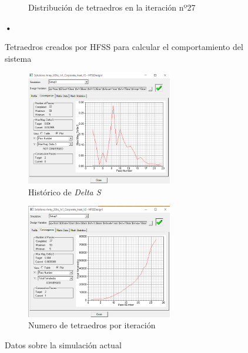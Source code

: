 \begin{figure}[H]
\begin{subfigure}[b]{0.4\textwidth}
         \caption{Distribución de tetraedros en la iteración nº27}
         \label{fig:tetrab}
     \end{subfigure}
        \caption{Tetraedros creados por HFSS para calcular el comportamiento del sistema}\textbf{•}
        \label{fig:tetra}
\end{figure}

\begin{figure}[H]
     \centering
     \begin{subfigure}[b]{\textwidth}
         \centering
         \includegraphics[width=0.7\textwidth]{archivos/desarrollo/11a}
         \caption{Histórico de \textit{Delta S}}
         \label{fig:convera}
     \end{subfigure}

     \begin{subfigure}[b]{\textwidth}
         \centering
         \includegraphics[width=0.7\textwidth]{archivos/desarrollo/11b}
         \caption{Numero de tetraedros por iteración}
         \label{fig:converb}
     \end{subfigure}

        \caption{Datos sobre la simulación actual}
        \label{fig:conver}
\end{figure}

